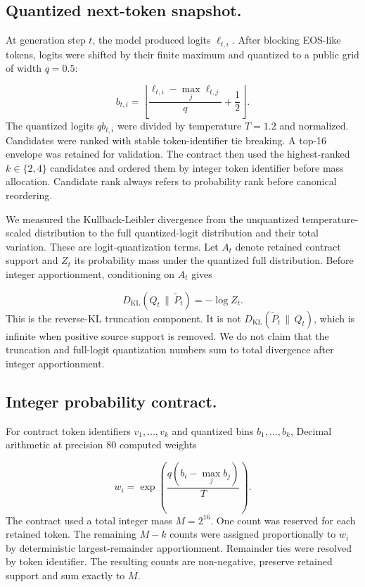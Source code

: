 \documentclass{nature}
\begin{document}
\begin{methods}
\subsection{Quantized next-token snapshot.}
At generation step \(t\), the model produced logits \(\ell_{t,i}\). After blocking EOS-like tokens, logits were shifted by their finite maximum and quantized to a public grid of width \(q=0.5\):

\[
b_{t,i}=\left\lfloor\frac{\ell_{t,i}-\max_j\ell_{t,j}}{q}+\frac{1}{2}\right\rfloor.
\]
The quantized logits \(q b_{t,i}\) were divided by temperature \(T=1.2\) and normalized. Candidates were ranked with stable token-identifier tie breaking. A top-16 envelope was retained for validation. The contract then used the highest-ranked \(k\in\{2,4\}\) candidates and ordered them by integer token identifier before mass allocation. Candidate rank always refers to probability rank before canonical reordering.

We measured the Kullback-Leibler divergence from the unquantized temperature-scaled distribution to the full quantized-logit distribution and their total variation. These are logit-quantization terms. Let \(A_t\) denote retained contract support and \(Z_t\) its probability mass under the quantized full distribution. Before integer apportionment, conditioning on \(A_t\) gives

\[
D_{\mathrm{KL}}(Q_t\,\|\,\widetilde P_t)=-\log Z_t.
\]
This is the reverse-KL truncation component. It is not \(D_{\mathrm{KL}}(\widetilde P_t\,\|\,Q_t)\), which is infinite when positive source support is removed. We do not claim that the truncation and full-logit quantization numbers sum to total divergence after integer apportionment.

\subsection{Integer probability contract.}
For contract token identifiers \(v_1,\ldots,v_k\) and quantized bins \(b_1,\ldots,b_k\), Decimal arithmetic at precision 80 computed weights

\[
w_i=\exp\left(\frac{q(b_i-\max_j b_j)}{T}\right).
\]
The contract used a total integer mass \(M=2^{16}\). One count was reserved for each retained token. The remaining \(M-k\) counts were assigned proportionally to \(w_i\) by deterministic largest-remainder apportionment. Remainder ties were resolved by token identifier. The resulting counts are non-negative, preserve retained support and sum exactly to \(M\).


\end{methods}
\end{document}
